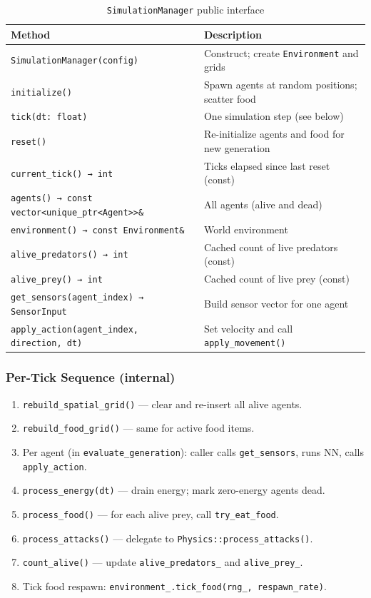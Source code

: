 \begin{table}[H]
\centering\small
\caption{\texttt{SimulationManager} public interface}
\begin{tabularx}{\textwidth}{@{}lX@{}}
\toprule
\textbf{Method} & \textbf{Description} \\
\midrule
\texttt{SimulationManager(config)} & Construct; create \texttt{Environment} and grids \\
\texttt{initialize()} & Spawn agents at random positions; scatter food \\
\texttt{tick(dt: float)} & One simulation step (see below) \\
\texttt{reset()} & Re-initialize agents and food for new generation \\
\texttt{current\_tick() → int} & Ticks elapsed since last reset (const) \\
\texttt{agents() → const vector<unique\_ptr<Agent>>\&} & All agents (alive and dead) \\
\texttt{environment() → const Environment\&} & World environment \\
\texttt{alive\_predators() → int} & Cached count of live predators (const) \\
\texttt{alive\_prey() → int} & Cached count of live prey (const) \\
\texttt{get\_sensors(agent\_index) → SensorInput} & Build sensor vector for one agent \\
\texttt{apply\_action(agent\_index, direction, dt)} & Set velocity and call \texttt{apply\_movement()} \\
\bottomrule
\end{tabularx}
\end{table}

\subsubsection{Per-Tick Sequence (internal)}
\begin{enumerate}[nosep]
  \item \texttt{rebuild\_spatial\_grid()} — clear and re-insert all alive agents.
  \item \texttt{rebuild\_food\_grid()} — same for active food items.
  \item Per agent (in \texttt{evaluate\_generation}): caller calls
    \texttt{get\_sensors}, runs NN, calls \texttt{apply\_action}.
  \item \texttt{process\_energy(dt)} — drain energy; mark zero-energy agents dead.
  \item \texttt{process\_food()} — for each alive prey, call \texttt{try\_eat\_food}.
  \item \texttt{process\_attacks()} — delegate to \texttt{Physics::process\_attacks()}.
  \item \texttt{count\_alive()} — update \texttt{alive\_predators\_} and
    \texttt{alive\_prey\_}.
  \item Tick food respawn: \texttt{environment\_.tick\_food(rng\_, respawn\_rate)}.
\end{enumerate}

